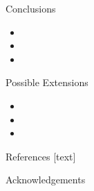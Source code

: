 \documentclass[final]{beamer}\usepackage[]{graphicx}\usepackage[]{color}
\newlength{\onecolwid}
\begin{document}
\begin{frame}[t]
\begin{columns}[t]
\begin{column}{\onecolwid}
\begin{block}{Conclusions}
\begin{itemize}
\item
\item
\item
\end{itemize}
\vspace{0ex}
\vfill
\end{block}
\vfill
\begin{block}{Possible Extensions}
\begin{itemize}
\item  
\item  
\item  
\end{itemize}
\vspace{0ex}
\vfill
\end{block}
\vfill

\begin{block}{References}
\footnotesize
{}[text]
\vspace{-1ex}



\normalsize
\vfill
\end{block} 
\vfill




\begin{block}{Acknowledgements}

\small{} \\

\end{block}


\end{column} %

\end{columns} %

\end{frame} %
\end{document}
